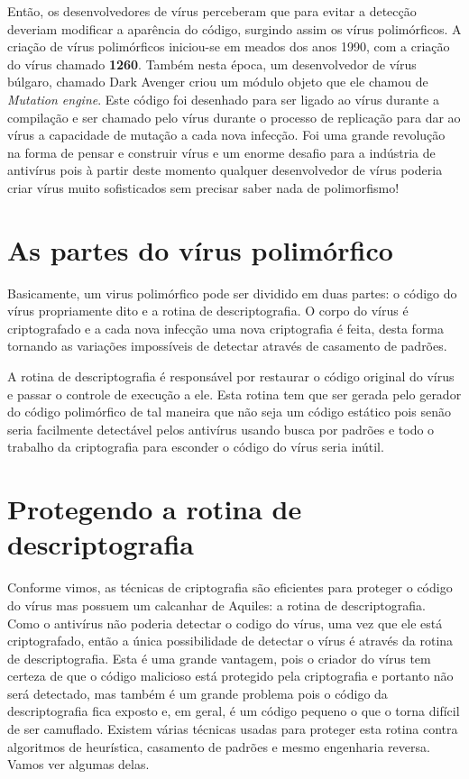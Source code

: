 Então, os desenvolvedores de vírus perceberam que para evitar a detecção deveriam modificar a aparência do código, surgindo assim os vírus polimórficos. A criação de vírus polimórficos iniciou-se em meados dos anos 1990, com a criação do vírus chamado \textbf{1260}\cite{wiki:8}. Também nesta época, um desenvolvedor de vírus búlgaro, chamado Dark Avenger\cite{wiki:9} criou um módulo objeto que ele chamou de \textit{Mutation engine}. Este código foi desenhado para ser ligado ao vírus durante a compilação e ser chamado pelo vírus durante o processo de replicação para dar ao vírus a capacidade de mutação a cada nova infecção. Foi uma grande revolução na forma de pensar e construir vírus e um enorme desafio para a indústria de antivírus pois à partir deste momento qualquer desenvolvedor de vírus poderia criar vírus muito sofisticados sem precisar saber nada de polimorfismo!

\section{As partes do vírus polimórfico}
Basicamente, um virus polimórfico pode ser dividido em duas partes: o código do vírus propriamente dito e a rotina de descriptografia. O corpo do vírus é criptografado e a cada nova infecção uma nova criptografia é feita, desta forma tornando as variações impossíveis de detectar através de casamento de padrões.

A rotina de descriptografia é responsável por restaurar o código original do vírus e passar o controle de execução a ele. Esta rotina tem que ser gerada pelo gerador do código polimórfico de tal maneira que não seja um código estático pois senão seria facilmente detectável pelos antivírus usando busca por padrões e todo o trabalho da criptografia para esconder o código do vírus seria inútil.

\section{Protegendo a rotina de descriptografia}
Conforme vimos, as técnicas de criptografia são eficientes para proteger o código do vírus mas possuem um calcanhar de Aquiles: a rotina de descriptografia. Como o antivírus não poderia detectar o codigo do vírus, uma vez que ele está criptografado, então a única possibilidade de detectar o vírus é através da rotina de descriptografia. Esta é uma grande vantagem, pois o criador do vírus tem certeza de que o código malicioso está protegido pela criptografia e portanto não será detectado, mas também é um grande problema pois o código da descriptografia fica exposto e, em geral, é um código pequeno o que o torna difícil de ser camuflado. Existem várias técnicas usadas para proteger esta rotina contra algoritmos de heurística, casamento de padrões e mesmo engenharia reversa. Vamos ver algumas delas.

